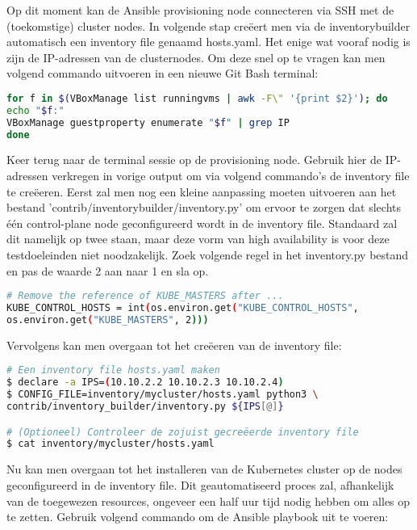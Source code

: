 Op dit moment kan de Ansible provisioning node connecteren via SSH met de (toekomstige) cluster nodes. In volgende stap creëert men via de inventory\textunderscore builder automatisch een inventory file genaamd hosts.yaml. Het enige wat vooraf nodig is zijn de IP-adressen van de clusternodes. Om deze snel op te vragen kan men volgend commando uitvoeren in een nieuwe Git Bash terminal:

\begin{lstlisting}[language=bash] 
for f in $(VBoxManage list runningvms | awk -F\" '{print $2}'); do
echo "$f:"
VBoxManage guestproperty enumerate "$f" | grep IP
done
\end{lstlisting}  

Keer terug naar de terminal sessie op de provisioning node. Gebruik hier de IP-adressen verkregen in vorige output om via volgend commando's de inventory file te creëeren. 
Eerst zal men nog een kleine aanpassing moeten uitvoeren aan het bestand 'contrib/inventory\textunderscore builder/inventory.py' om ervoor te zorgen dat slechts één control-plane node geconfigureerd wordt in de inventory file. Standaard zal dit namelijk op twee staan, maar deze vorm van high availability is voor deze testdoeleinden niet noodzakelijk. 
Zoek volgende regel in het inventory.py bestand en pas de waarde 2 aan naar 1 en sla op.

\begin{lstlisting}[language=bash]
# Remove the reference of KUBE_MASTERS after ...
KUBE_CONTROL_HOSTS = int(os.environ.get("KUBE_CONTROL_HOSTS",
os.environ.get("KUBE_MASTERS", 2)))
\end{lstlisting}  

Vervolgens kan men overgaan tot het creëeren van de inventory file: 

\begin{lstlisting}[language=bash]
# Een inventory file hosts.yaml maken
$ declare -a IPS=(10.10.2.2 10.10.2.3 10.10.2.4)
$ CONFIG_FILE=inventory/mycluster/hosts.yaml python3 \
contrib/inventory_builder/inventory.py ${IPS[@]}    

# (Optioneel) Controleer de zojuist gecreëerde inventory file
$ cat inventory/mycluster/hosts.yaml
\end{lstlisting}

Nu kan men overgaan tot het installeren van de Kubernetes cluster op de nodes geconfigureerd in de inventory file. Dit geautomatiseerd proces zal, afhankelijk van de toegewezen resources, ongeveer een half uur tijd nodig hebben om alles op te zetten. Gebruik volgend commando om de Ansible playbook uit te voeren: 

